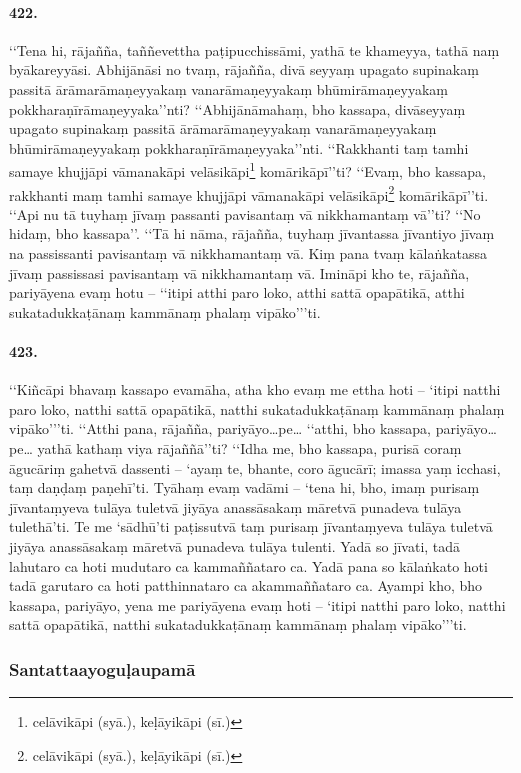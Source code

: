 \paragraph{422.} ‘‘Tena hi, rājañña, taññevettha paṭipucchissāmi, yathā te khameyya, tathā naṃ byākareyyāsi. Abhijānāsi no tvaṃ, rājañña, divā seyyaṃ upagato supinakaṃ passitā ārāmarāmaṇeyyakaṃ vanarāmaṇeyyakaṃ bhūmirāmaṇeyyakaṃ pokkharaṇīrāmaṇeyyaka’’nti? ‘‘Abhijānāmahaṃ, bho kassapa, divāseyyaṃ upagato supinakaṃ passitā ārāmarāmaṇeyyakaṃ vanarāmaṇeyyakaṃ bhūmirāmaṇeyyakaṃ pokkharaṇīrāmaṇeyyaka’’nti. ‘‘Rakkhanti taṃ tamhi samaye khujjāpi vāmanakāpi velāsikāpi\footnote{celāvikāpi (syā.), keḷāyikāpi (sī.)} komārikāpī’’ti? ‘‘Evaṃ, bho kassapa, rakkhanti maṃ tamhi samaye khujjāpi vāmanakāpi velāsikāpi\footnote{celāvikāpi (syā.), keḷāyikāpi (sī.)} komārikāpī’’ti. ‘‘Api nu tā tuyhaṃ jīvaṃ passanti pavisantaṃ vā nikkhamantaṃ vā’’ti? ‘‘No hidaṃ, bho kassapa’’. ‘‘Tā hi nāma, rājañña, tuyhaṃ jīvantassa jīvantiyo jīvaṃ na passissanti pavisantaṃ vā nikkhamantaṃ vā. Kiṃ pana tvaṃ kālaṅkatassa jīvaṃ passissasi pavisantaṃ vā nikkhamantaṃ vā. Imināpi kho te, rājañña, pariyāyena evaṃ hotu – ‘‘itipi atthi paro loko, atthi sattā opapātikā, atthi sukatadukkaṭānaṃ kammānaṃ phalaṃ vipāko’’’ti.

\paragraph{423.} ‘‘Kiñcāpi bhavaṃ kassapo evamāha, atha kho evaṃ me ettha hoti – ‘itipi natthi paro loko, natthi sattā opapātikā, natthi sukatadukkaṭānaṃ kammānaṃ phalaṃ vipāko’’’ti. ‘‘Atthi pana, rājañña, pariyāyo…pe… ‘‘atthi, bho kassapa, pariyāyo…pe… yathā kathaṃ viya rājaññā’’ti? ‘‘Idha me, bho kassapa, purisā coraṃ āgucāriṃ gahetvā dassenti – ‘ayaṃ te, bhante, coro āgucārī; imassa yaṃ icchasi, taṃ daṇḍaṃ paṇehī’ti. Tyāhaṃ evaṃ vadāmi – ‘tena hi, bho, imaṃ purisaṃ jīvantaṃyeva tulāya tuletvā jiyāya anassāsakaṃ māretvā punadeva tulāya tulethā’ti. Te me ‘sādhū’ti paṭissutvā taṃ purisaṃ jīvantaṃyeva tulāya tuletvā jiyāya anassāsakaṃ māretvā punadeva tulāya tulenti. Yadā so jīvati, tadā lahutaro ca hoti mudutaro ca kammaññataro ca. Yadā pana so kālaṅkato hoti tadā garutaro ca hoti patthinnataro ca akammaññataro ca. Ayampi kho, bho kassapa, pariyāyo, yena me pariyāyena evaṃ hoti – ‘itipi natthi paro loko, natthi sattā opapātikā, natthi sukatadukkaṭānaṃ kammānaṃ phalaṃ vipāko’’’ti.

\subsubsection{Santattaayoguḷaupamā}

